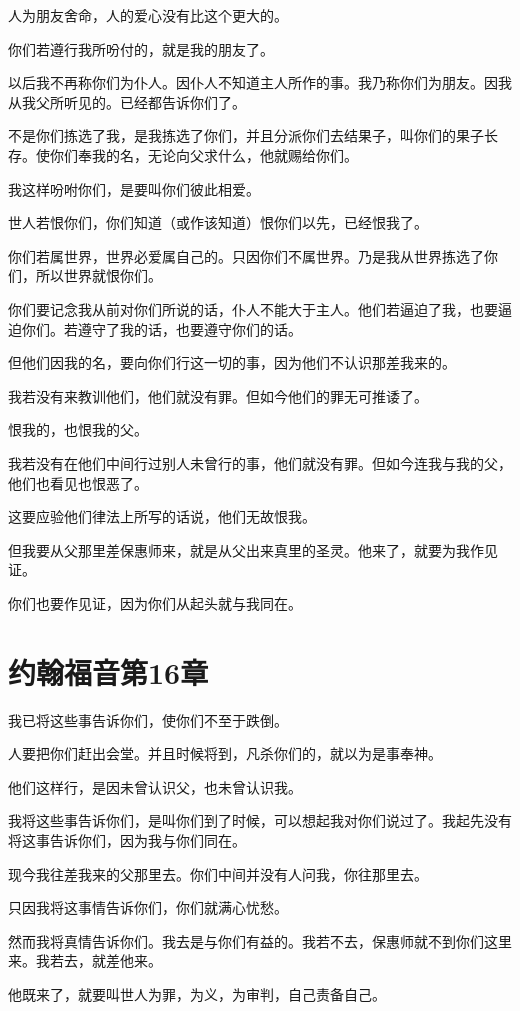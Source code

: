 \documentclass[12pt,oneside]{book}
\begin{document}
人为朋友舍命，人的爱心没有比这个更大的。

你们若遵行我所吩付的，就是我的朋友了。

以后我不再称你们为仆人。因仆人不知道主人所作的事。我乃称你们为朋友。因我从我父所听见的。已经都告诉你们了。

不是你们拣选了我，是我拣选了你们，并且分派你们去结果子，叫你们的果子长存。使你们奉我的名，无论向父求什么，他就赐给你们。

我这样吩咐你们，是要叫你们彼此相爱。

世人若恨你们，你们知道（或作该知道）恨你们以先，已经恨我了。

你们若属世界，世界必爱属自己的。只因你们不属世界。乃是我从世界拣选了你们，所以世界就恨你们。

你们要记念我从前对你们所说的话，仆人不能大于主人。他们若逼迫了我，也要逼迫你们。若遵守了我的话，也要遵守你们的话。

但他们因我的名，要向你们行这一切的事，因为他们不认识那差我来的。

我若没有来教训他们，他们就没有罪。但如今他们的罪无可推诿了。

恨我的，也恨我的父。

我若没有在他们中间行过别人未曾行的事，他们就没有罪。但如今连我与我的父，他们也看见也恨恶了。

这要应验他们律法上所写的话说，他们无故恨我。

但我要从父那里差保惠师来，就是从父出来真里的圣灵。他来了，就要为我作见证。

你们也要作见证，因为你们从起头就与我同在。

\chapter{约翰福音第16章}
我已将这些事告诉你们，使你们不至于跌倒。

人要把你们赶出会堂。并且时候将到，凡杀你们的，就以为是事奉神。

他们这样行，是因未曾认识父，也未曾认识我。

我将这些事告诉你们，是叫你们到了时候，可以想起我对你们说过了。我起先没有将这事告诉你们，因为我与你们同在。

现今我往差我来的父那里去。你们中间并没有人问我，你往那里去。

只因我将这事情告诉你们，你们就满心忧愁。

然而我将真情告诉你们。我去是与你们有益的。我若不去，保惠师就不到你们这里来。我若去，就差他来。

他既来了，就要叫世人为罪，为义，为审判，自己责备自己。
\end{document}
